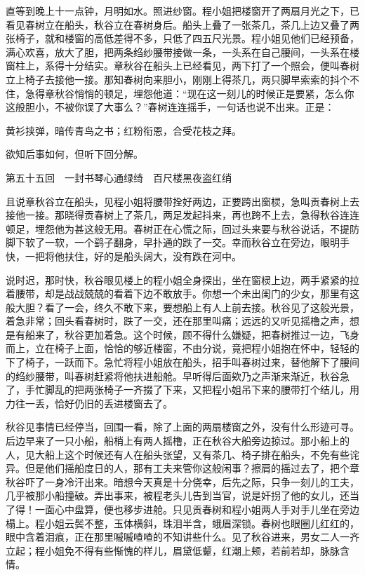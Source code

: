 \documentclass[12pt,UTF8]{ctexbook}
\begin{document}
{{{直等到晚上十一点钟，月明如水。照进纱窗。程小姐把楼窗开了两扇月光之下，已看见春树立在船头，秋谷立在春树身后。船头上叠了一张茶几，茶几上边又叠了两张椅子，就和楼窗的高低差得不多，只低了四五尺光景。程小姐见他们已经预备，满心欢喜，放大了胆，把两条绉纱腰带接做一条，一头系在自己腰间，一头系在楼窗柱上，系得十分结实。章秋谷在船头上已经看见，两下打了一个照会，便叫春树立上椅子去接他一接。那知春树向来胆小，刚刚上得茶几，两只脚早索索的抖个不住，急得章秋谷悄悄的顿足，埋怨他道：“现在这一刻儿的时候正是要紧，怎么你这般胆小，不被你误了大事么？”春树连连摇手，一句话也说不出来。正是：

黄衫挟弹，暗传青鸟之书；红粉衔恩，合受花枝之拜。

欲知后事如何，但听下回分解。





第五十五回　一封书琴心通绿绮　百尺楼黑夜盗红绡





且说章秋谷立在船头，见程小姐将腰带拴好两边，正要跨出窗棂，急叫贡春树上去接他一接。那晓得贡春树上了茶几，两足发起抖来，再也跨不上去，急得秋谷连连顿足，埋怨他为甚这般无用。春树正在心慌之际，回过头来要与秋谷说话，不提防脚下软了一软，一个鹞子翻身，早扑通的跌了一交。幸而秋谷立在旁边，眼明手快，一把将他扶住，好的是船头阔大，没有跌在河中。

说时迟，那时快，秋谷眼见楼上的程小姐全身探出，坐在窗棂上边，两手紧紧的拉着腰带，却是战战兢兢的看着下边不敢放手。你想一个未出闺门的少女，那里有这般大胆？看了一会，终久不敢下来，要想船上有人上前去接。秋谷见了这般光景，着急非常；回头看春树时，跌了一交，还在那里叫痛；远远的又听见摇橹之声，想是有船来了，秋谷更加着急。这个时候，顾不得什么嫌疑，把春树推过一边，飞身而上，立在椅子上面，恰恰的够近楼窗，不由分说，竟把程小姐抱在怀中，轻轻的下了椅子，一跃而下。急忙将程小姐放在船头，招手叫春树过来，替他解下了腰间的绉纱腰带，叫春树赶紧将他扶进船舱。早听得后面欸乃之声渐来渐近，秋谷急了，手忙脚乱的把两张椅子一齐掇了下来，又把程小姐吊下来的腰带打个结儿，用力往一丢，恰好仍旧的丢进楼窗去了。

秋谷见事情已经停当，回围一看，除了上面的两扇楼窗之外，没有什么形迹可寻。后边早来了一只小船，船梢上有两人摇橹，正在秋谷大船旁边掠过。那小船上的人，见大船上这个时候还有人在船头张望，又有茶几、椅子排在船头，不免有些诧异。但是他们摇船度日的人，那有工夫来管你这般闲事？擦肩的摇过去了，把个章秋谷吓了一身冷汗出来。暗想今天真是十分侥幸，后先之际，只争一刻儿的工夫，几乎被那小船撞破。弄出事来，被程老头儿告到当官，说是奸拐了他的女儿，还当了得！一面心中盘算，便也移步进舱。只见贡春树和程小姐两人手对手儿坐在旁边榻上。程小姐云鬓不整，玉体横斜，珠泪半含，蛾眉深锁。春树也眼圈儿红红的，眼中含着泪痕，正在那里嘁嘁喳喳的不知讲些什么。见了秋谷进来，男女二人一齐立起；程小姐免不得有些惭愧的样儿，眉黛低颦，红潮上颊，若前若却，脉脉含情。

}}}
\end{document}
